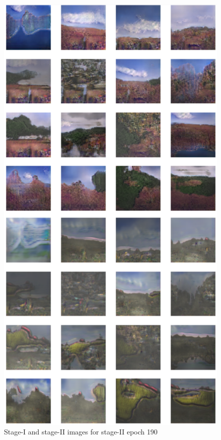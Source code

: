 \documentclass{article}
\begin{document}
	\begin{figure}[h]
	\centering
	\includegraphics[scale=0.6]{images/epoch190_FID430.png}
	\caption{Stage-I and stage-II images for stage-II epoch 190}
	\end{figure}
\end{document}
